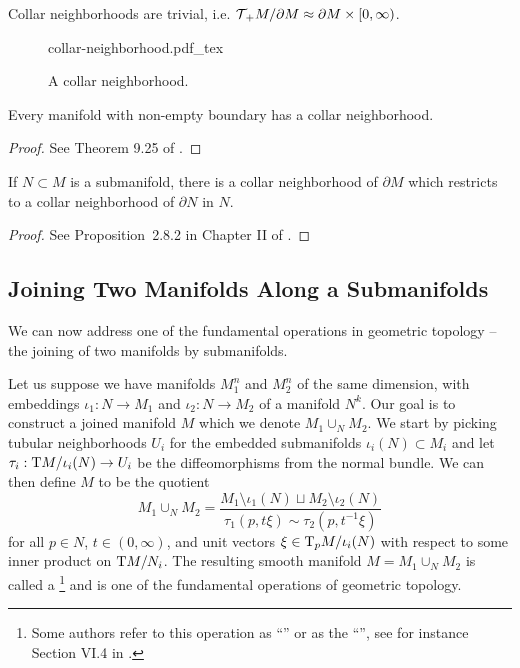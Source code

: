 \begin{proposition}
	Collar neighborhoods are trivial, i.e. ${\mathcal{T}\hspace{-0.1em}}_+ M /\partial M\approx \partial M\times [0,\infty)$.
\end{proposition}

\begin{figure}[ht]
	\centering
	{collar-neighborhood.pdf_tex}
	\caption{A collar neighborhood.}\label{fig:collar-neighborhoods}
\end{figure}

\begin{theorem}\label{thm:collar-neighborhood}
	Every manifold with non-empty boundary has a collar neighborhood.
\end{theorem}
\begin{proof}
	See Theorem 9.25 of \cite{lee2013smooth}.
\end{proof}

\begin{proposition}
	If $N\subset M$ is a submanifold, there is a collar neighborhood of $\partial M$ which restricts to a collar neighborhood of $\partial N$ in $N$.
\end{proposition}
\begin{proof}
	See Proposition~2.8.2 in Chapter II of \cite{kosinski1993differential}.
\end{proof}

\subsection{Joining Two Manifolds Along a Submanifolds}

We can now address one of the fundamental operations in geometric topology -- the joining of two manifolds by submanifolds.

Let us suppose we have manifolds $M_1^n$ and $M_2^n$ of the same dimension, with embeddings $\iota_1 : N\to M_1$ and $\iota_2 : N\to M_2$ of a manifold $N^k$. Our goal is to construct a joined manifold $M$ which we denote $M_1\cup_N M_2$.
We start by picking tubular neighborhoods $U_i$ for the embedded submanifolds $\iota_i(N)\subset M_i$ and let $\tau_i: \mathrm{T} M/\iota_i(N) \to U_i$ be the diffeomorphisms from the normal bundle.
We can then define $M$ to be the quotient
\begin{equation}\label{eq:join-definition}
	M_1\cup_N M_2 = \frac{M_1\setminus \iota_1(N)\sqcup M_2\setminus \iota_2(N)}{\tau_1(p, t\xi) \sim \tau_2(p, t^{-1}\xi)}
\end{equation}
for all $p\in N$, $t\in(0,\infty)$, and unit vectors $\xi\in \mathrm{T}_p M/\iota_i(N)$ with respect to some inner product on $\mathrm{T} M/N_i$. The resulting smooth manifold $M=M_1\cup_N M_2$ is called a \footnote{Some authors refer to this operation as ``'' or as the ``'', see for instance Section VI.4 in \cite{kosinski1993differential}.} and is one of the fundamental operations of geometric topology.

